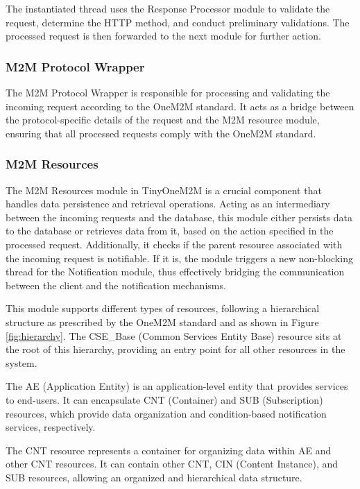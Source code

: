 \documentclass[a4paper,fleqn]{cas-dc}
\begin{document}
The instantiated thread uses the Response Processor module to validate the request, determine the HTTP method, and conduct preliminary validations. The processed request is then forwarded to the next module for further action.

\subsubsection{M2M Protocol Wrapper}

The M2M Protocol Wrapper is responsible for processing and validating the incoming request according to the OneM2M standard. It acts as a bridge between the protocol-specific details of the request and the M2M resource module, ensuring that all processed requests comply with the OneM2M standard.

\subsubsection{M2M Resources}\label{sec:M2MResource}

The M2M Resources module in TinyOneM2M is a crucial component that handles data persistence and retrieval operations. Acting as an intermediary between the incoming requests and the database, this module either persists data to the database or retrieves data from it, based on the action specified in the processed request. Additionally, it checks if the parent resource associated with the incoming request is notifiable. If it is, the module triggers a new non-blocking thread for the Notification module, thus effectively bridging the communication between the client and the notification mechanisms.

This module supports different types of resources, following a hierarchical structure as prescribed by the OneM2M standard and as shown in Figure \ref{fig:hierarchy}. The CSE\_Base (Common Services Entity Base) resource sits at the root of this hierarchy, providing an entry point for all other resources in the system.

The AE (Application Entity) is an application-level entity that provides services to end-users. It can encapsulate CNT (Container) and SUB (Subscription) resources, which provide data organization and condition-based notification services, respectively.

The CNT resource represents a container for organizing data within AE and other CNT resources. It can contain other CNT, CIN (Content Instance), and SUB resources, allowing an organized and hierarchical data structure.
\end{document}
